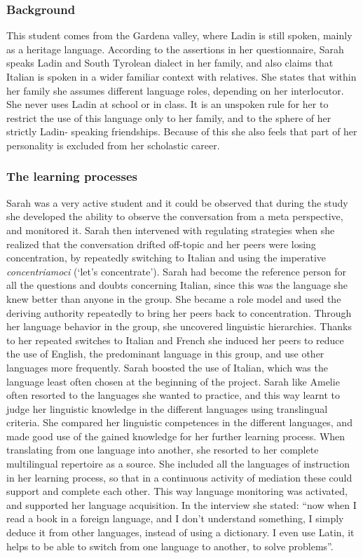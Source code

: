 \documentclass[output=paper]{../langscibook}
\begin{document}
\subsubsection{Background}
\largerpage
This student comes from the Gardena valley, where Ladin is still spoken, mainly as a heritage language. According to the assertions in her questionnaire, Sarah speaks Ladin and South Tyrolean dialect in her family, and also claims that Italian is spoken in a wider familiar context with relatives. She states that within her family she assumes different language roles, depending on her interlocutor. She never uses Ladin at school or in class. It is an unspoken rule for her to restrict the use of this language only to her family, and to the sphere of her strictly Ladin- speaking friendships. Because of this she also feels that part of her personality is excluded from her scholastic career.

\subsubsection{The learning processes}

Sarah was a very active student and it could be observed that during the study she developed the ability to observe the conversation from a meta perspective, and monitored it. Sarah then intervened with regulating strategies when she realized that the conversation drifted off-topic and her peers were losing concentration, by repeatedly switching to Italian and using the imperative \emph{concentriamoci} (`let’s concentrate'). Sarah had become the reference person for all the questions and doubts concerning Italian, since this was the language she knew better than anyone in the group. She became a role model and used the deriving authority repeatedly to bring her peers back to concentration. Through her language behavior in the group, she uncovered linguistic hierarchies. Thanks to her repeated switches to Italian and French she induced her peers to reduce the use of English, the predominant language in this group, and use other languages more frequently. Sarah boosted the use of Italian, which was the language least often chosen at the beginning of the project. Sarah like Amelie often resorted to the languages she wanted to practice, and this way learnt to judge her linguistic knowledge in the different languages using translingual criteria. She compared her linguistic competences in the different languages, and made good use of the gained knowledge for her further learning process. When translating from one language into another, she resorted to her complete multilingual repertoire as a source. She included all the languages of instruction in her learning process, so that in a continuous activity of mediation these could support and complete each other. This way language monitoring was activated, and supported her language acquisition. In the interview she stated: “now when I read a book in a foreign language, and I don’t understand something, I simply deduce it from other languages, instead of using a dictionary. I even use Latin, it helps to be able to switch from one language to another, to solve problems”.
\end{document}
